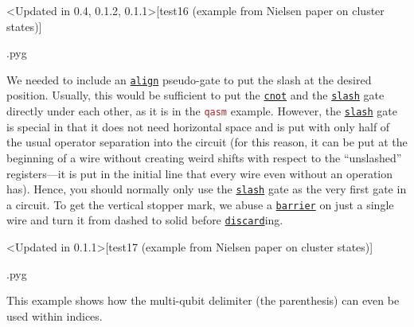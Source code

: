 \documentclass{scrartcl}
\makeatletter
\newenvironment{codeexample}{%
   \VerbatimEnvironment%
   \let\FVB@VerbatimOut\minted@FVB@VerbatimOut
   \let\FVE@VerbatimOut\minted@FVE@VerbatimOut
   \minted@configlang{tex}%
   \minted@fvset
   \begin{VerbatimOut}[codes={\catcode`\^^I=12},firstline,lastline]{\minted@jobname.pyg}%
}{
   \end{VerbatimOut}%
   \minted@langlinenoson%
   \savebox\codeexamplebox{ \minted@jobname.pyg}%
   \ifdim\wd\codeexamplebox>\dimexpr.5\linewidth-3mm\relax%
      \wd\codeexamplebox=.5\linewidth%
   \else%
      \wd\codeexamplebox=\dimexpr\wd\codeexamplebox+3mm\relax%
   \fi%
   \noindent\begin{minipage}{\wd\codeexamplebox}%
      \centering%
      \usebox\codeexamplebox%
   \end{minipage}%
   \begin{minipage}{\dimexpr\linewidth-\wd\codeexamplebox\relax}%
      \expandafter\minted@pygmentize\expandafter{\minted@lang}%
   \end{minipage}%
   \minted@langlinenosoff%
   \par%
}
\def\pkg#1{\textcolor{brown}{\texttt{#1}}}
\def\gate#1{\hyperref[gate:#1]{\texttt{#1}}}
\makeatother
\begin{document}
         \begin{example}<Updated in 0.4, 0.1.2, 0.1.1>[test16 (example from Nielsen paper on cluster states)]
            \begin{codeexample}
            \end{codeexample}
            We needed to include an \gate{align} pseudo\hyp gate to put the slash at the desired position.
            Usually, this would be sufficient to put the \gate{cnot} and the \gate{slash} gate directly under each other, as it is in the \pkg{qasm} example.
            However, the \gate{slash} gate is special in that it does not need horizontal space and is put with only half of the usual operator separation into the circuit (for this reason, it can be put at the beginning of a wire without creating weird shifts with respect to the ``unslashed'' registers---it is put in the initial line that every wire even without an operation has).
            Hence, you should normally only use the \gate{slash} gate as the very first gate in a circuit.
            To get the vertical stopper mark, we abuse a \gate{barrier} on just a single wire and turn it from dashed to solid before \gate{discard}ing.
         \end{example}

         \begin{example}<Updated in 0.1.1>[test17 (example from Nielsen paper on cluster states)]
            \begin{codeexample}
            \end{codeexample}
            This example shows how the multi\hyp qubit delimiter (the parenthesis) can even be used within indices.
         \end{example}
\end{document}
